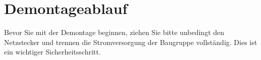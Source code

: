 %
%
%

\chapter{Demontageablauf}
Bevor Sie mit der Demontage beginnen, ziehen Sie bitte unbedingt den Netzstecker und trennen die Stromversorgung der Baugruppe vollständig. Dies ist ein wichtiger Sicherheitsschritt.
